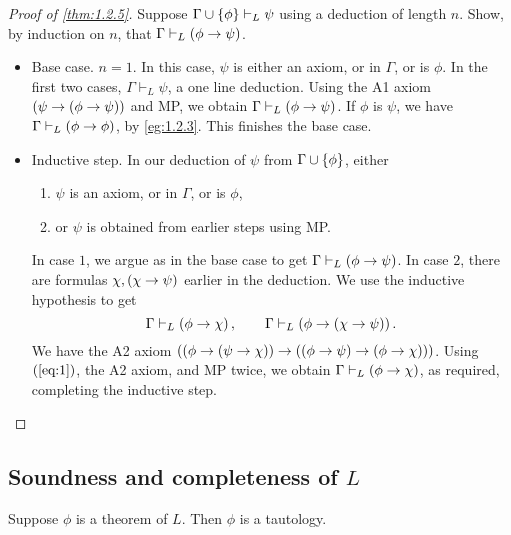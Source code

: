 \begin{proof}[Proof of \ref{thm:1.2.5}]
Suppose $ \Gamma \cup \left\{ \phi \right\} \vdash_L \psi $ using a deduction of length $ n $. Show, by induction on $ n $, that $ \Gamma \vdash_L \left( \phi \rightarrow \psi \right) $.
\begin{itemize}
\item Base case. $ n = 1 $. In this case, $ \psi $ is either an axiom, or in $ \Gamma $, or is $ \phi $. In the first two cases, $ \Gamma \vdash_L \psi $, a one line deduction. Using the A1 axiom $ \left( \psi \rightarrow \left( \phi \rightarrow \psi \right) \right) $ and MP, we obtain $ \Gamma \vdash_L \left( \phi \rightarrow \psi \right) $. If $ \phi $ is $ \psi $, we have $ \Gamma \vdash_L \left( \phi \rightarrow \phi \right) $, by \ref{eg:1.2.3}. This finishes the base case.
\item Inductive step. In our deduction of $ \psi $ from $ \Gamma \cup \left\{ \phi \right\} $, either
\begin{enumerate}[leftmargin=0.5in, label=Case \arabic*.]
\item $ \psi $ is an axiom, or in $ \Gamma $, or is $ \phi $,
\item or $ \psi $ is obtained from earlier steps using MP.
\end{enumerate}
In case $ 1 $, we argue as in the base case to get $ \Gamma \vdash_L \left( \phi \rightarrow \psi \right) $. In case $ 2 $, there are formulas $ \chi, \left( \chi \rightarrow \psi \right) $ earlier in the deduction. We use the inductive hypothesis to get
\begin{equation}
\label{eq:1}
\Gamma \vdash_L \left( \phi \rightarrow \chi \right), \qquad \Gamma \vdash_L \left( \phi \rightarrow \left( \chi \rightarrow \psi \right) \right).
\end{equation}
We have the A2 axiom $ \left( \left( \phi \rightarrow \left( \psi \rightarrow \chi \right) \right) \rightarrow \left( \left( \phi \rightarrow \psi \right) \rightarrow \left( \phi \rightarrow \chi \right) \right) \right) $. Using $ \left( \ref{eq:1} \right) $, the A2 axiom, and MP twice, we obtain $ \Gamma \vdash_L \left( \phi \rightarrow \chi \right) $, as required, completing the inductive step.
\end{itemize}
\end{proof}


\subsection{Soundness and completeness of $ L $}

\begin{theorem}[Soundness of $ L $]
\label{thm:1.3.1}
Suppose $ \phi $ is a theorem of $ L $. Then $ \phi $ is a tautology.
\end{theorem}


